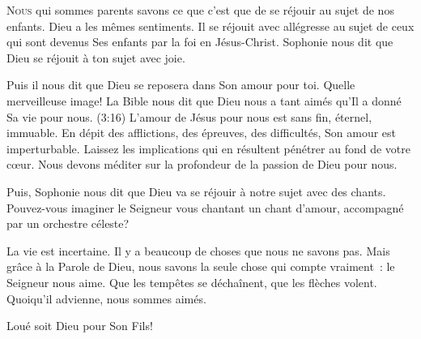 \dvrule






\lettrine{N}{ous} qui sommes parents savons ce que c'est que de se réjouir
 au sujet de nos enfants. Dieu a les mêmes sentiments.
 Il se réjouit avec allégresse au sujet de ceux qui sont devenus
 Ses enfants par la foi en Jésus-Christ. Sophonie nous dit que
 \Og Dieu se réjouit à ton sujet avec joie. \Fg{}

Puis il nous dit que Dieu \Og se reposera dans Son amour pour toi. \Fg{}
 Quelle merveilleuse image! La Bible nous dit que Dieu nous a tant aimés
 qu'Il a donné Sa vie pour nous. (3:16)
 L'amour de Jésus pour nous est sans fin, éternel, immuable.
 En dépit des afflictions, des épreuves, des difficultés,
 Son amour est imperturbable. Laissez les implications qui en résultent
 pénétrer  au fond de votre c\oe{}ur.
 Nous devons méditer sur la profondeur de la passion de Dieu pour nous. 


Puis, Sophonie nous dit que Dieu va \Og se réjouir à notre sujet
 avec des chants. \Fg{} Pouvez-vous imaginer le Seigneur vous chantant
 un chant d'amour, accompagné par un orchestre céleste? 

La vie est incertaine. Il y a beaucoup de choses que nous ne savons pas.
 Mais grâce à la Parole de Dieu, nous savons la seule chose
 qui compte vraiment~: le Seigneur nous aime. Que les tempêtes se déchaînent,
 que les flèches volent. Quoiqu'il advienne, nous sommes aimés. 

Loué soit Dieu pour Son Fils! 

\dvrule



